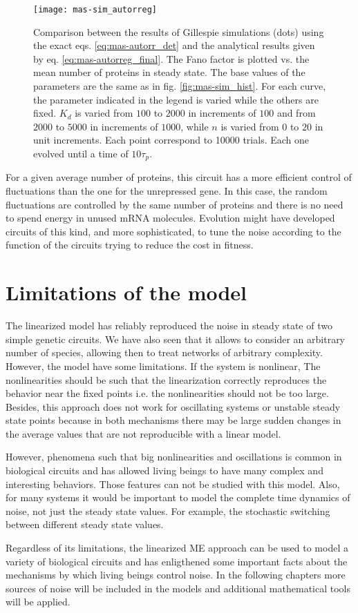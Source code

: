 \begin{figure}[H]
  \centering
  \texttt{[image: mas-sim\_autorreg]}
  \caption[Fano factor of protein number for a negatively autorregulated gene]{\label{fig:mas-sim_autorreg} Comparison between the results of Gillespie simulations (dots) using the exact eqs. \eqref{eq:mas-autorr_det} and the analytical results given by eq. \eqref{eq:mas-autorreg_final}. The Fano factor is plotted vs. the mean number of proteins in steady state. The base values of the parameters are the same as in fig. \ref{fig:mas-sim_hist}. For each curve, the parameter indicated in the legend is varied while the others are fixed. $K_d$ is varied from $100$ to $2000$ in increments of $100$ and from $2000$ to $5000$ in increments of $1000$, while $n$ is varied from $0$ to $20$ in unit increments. Each point correspond to 10000 trials. Each one evolved until a time of $10\tau_p$.}
\end{figure}

For a given average number of proteins, this circuit has a more efficient control of fluctuations than the one for the unrepressed gene. In this case, the random fluctuations are controlled by the same number of proteins and there is no need to spend energy in unused mRNA molecules. Evolution might have developed circuits of this kind, and more sophisticated, to tune the noise according to the function of the circuits trying to reduce the cost in fitness.

\section{Limitations of the model}

The linearized model has reliably reproduced the noise in steady state of two simple genetic circuits. We have also seen that it allows to consider an arbitrary number of species, allowing then to treat networks of arbitrary complexity. However, the model have some limitations. If the system is nonlinear, The nonlinearities should be such that the linearization correctly reproduces the behavior near the fixed points i.e. the nonlinearities should not be too large. Besides, this approach does not work for oscillating systems or unstable steady state points because in both mechanisms there may be large sudden changes in the average values that are not reproducible with a linear model.

However, phenomena such that big nonlinearities and oscillations is common in biological circuits and has allowed living beings to have many complex and interesting behaviors. Those features can not be studied with this model. Also, for many systems it would be important to model the complete time dynamics of noise, not just the steady state values. For example, the stochastic switching between different steady state values.

Regardless of its limitations, the linearized ME approach can be used to model a variety of biological circuits and has enligthened some important facts about the mechanisms by which living beings control noise. In the following chapters more sources of noise will be included in the models and additional mathematical tools will be applied.
